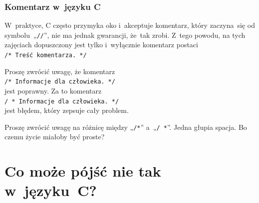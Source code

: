 \documentclass[10pt,t]{beamer}
\begin{document}
\begin{frame}
  \frametitle{Komentarz w~języku C}


  W~praktyce, C często przymyka oko i~akceptuje komentarz, który zaczyna~się
  od symbolu~„\texttt{//}”, \alert{nie} ma jednak gwarancji, że~tak zrobi.
  Z~tego powodu, na tych zajęciach dopuszczony jest tylko i~wyłącznie
  komentarz postaci \\
  \texttt{/* Treść komentarza. */}

  Proszę zwrócić uwagę, że komentarz \\
  \texttt{/* Informacje dla człowieka. */} \\
  jest poprawny. Za to komentarz \\
  \texttt{/ * Informacje dla człowieka. */} \\
  jest błędem, który zepsuje cały problem.

  Proszę zwrócić uwagę na różnicę między „\texttt{/*}” a~„\texttt{/ *}”.
  Jedna głupia spacja. Bo czemu życie miałoby być proste?

\end{frame}










\section{Co może pójść nie tak w~języku~C?}
\end{document}
